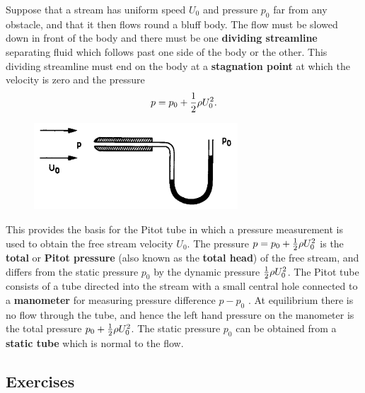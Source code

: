 \documentclass[twoside,a4paper,11pt]{report}
\begin{document}
Suppose that a stream has uniform speed $U_{0}$ and pressure $p_{0}$ far 
from any obstacle, and that it then flows round a bluff body. The flow must 
be slowed down in front of the body and there must be one \textbf{dividing 
streamline} separating fluid which follows past one side of the body or the 
other. This dividing streamline must end on the body at a \textbf{stagnation 
point} at which the velocity is zero and the pressure
\[
p=p_0 +{1 \over 2}\rho U_0^2 .
\]

\begin{figure}
\centerline{\includegraphics[width=3in]{Section33.pdf}}
\label{fig3}
\end{figure}

This provides the basis for the Pitot tube in which a pressure measurement 
is used to obtain the free stream velocity $U_{0}$. The pressure 
$p=p_0 +\textstyle{1 \over 2}\rho U_0^2 $ is the 
\textbf{total} or \textbf{Pitot pressure} (also known as the \textbf{total 
head}) of the free stream, and differs from the static pressure $p_{0}$ by 
the dynamic pressure $\textstyle{1 \over 2}\rho U_0^2 $. The Pitot tube 
consists of a tube directed into the stream with a small central hole 
connected to a \textbf{manometer} for measuring pressure difference $p - 
p_{0}$ . At equilibrium there is no flow through the tube, and hence the 
left hand pressure on the manometer is the total pressure $p_0 
+\textstyle{1 \over 2}\rho U_0^2 $. The static pressure $p_{0}$ can 
be obtained from a \textbf{static tube} which is normal to the flow.

\subsection*{Exercises}
\end{document}
